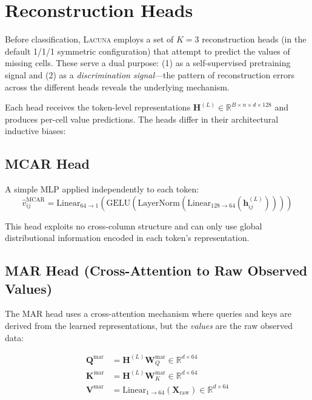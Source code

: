 \documentclass[11pt]{article}
\newcommand{\RR}{\mathbb{R}}
\newcommand{\layernorm}{\text{LayerNorm}}
\newcommand{\gelu}{\text{GELU}}
\newcommand{\lacuna}{\textsc{Lacuna}}
\begin{document}
\section{Reconstruction Heads}
\label{sec:reconstruction}

Before classification, \lacuna{} employs a set of $K = 3$ reconstruction heads (in the default 1/1/1 symmetric configuration) that attempt to predict the values of missing cells. These serve a dual purpose: (1) as a self-supervised pretraining signal and (2) as a \emph{discrimination signal}---the pattern of reconstruction errors across the different heads reveals the underlying mechanism.

Each head receives the token-level representations $\mathbf{H}^{(L)} \in \RR^{B \times n \times d \times 128}$ and produces per-cell value predictions. The heads differ in their architectural inductive biases:

\subsection{MCAR Head}

A simple MLP applied independently to each token:
\begin{equation}
\hat{v}^{\text{MCAR}}_{ij} = \text{Linear}_{64 \to 1}\!\left(\gelu\!\left(\layernorm\!\left(\text{Linear}_{128 \to 64}\!\left(\mathbf{h}^{(L)}_{ij}\right)\right)\right)\right)
\label{eq:mcar_head}
\end{equation}

This head exploits no cross-column structure and can only use global distributional information encoded in each token's representation.

\subsection{MAR Head (Cross-Attention to Raw Observed Values)}

The MAR head uses a cross-attention mechanism where queries and keys are derived from the learned representations, but the \emph{values} are the raw observed data:

\begin{align}
\mathbf{Q}^{\text{mar}} &= \mathbf{H}^{(L)} \mathbf{W}^{\text{mar}}_Q \in \RR^{d \times 64} \label{eq:mar_q} \\
\mathbf{K}^{\text{mar}} &= \mathbf{H}^{(L)} \mathbf{W}^{\text{mar}}_K \in \RR^{d \times 64} \label{eq:mar_k} \\
\mathbf{V}^{\text{mar}} &= \text{Linear}_{1 \to 64}\!\left(\mathbf{X}_{\text{raw}}\right) \in \RR^{d \times 64} \label{eq:mar_v}
\end{align}
\end{document}
